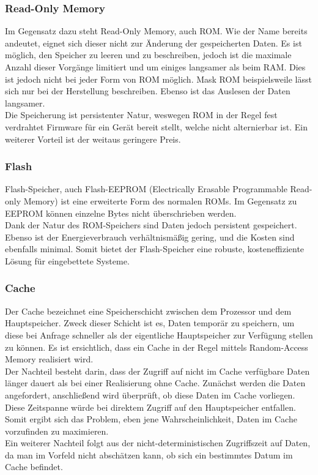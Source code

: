 \subsubsection{Read-Only Memory}
Im Gegensatz dazu steht Read-Only Memory, auch ROM. Wie der Name bereits andeutet, eignet sich dieser nicht zur Änderung der gespeicherten Daten. Es ist möglich, den Speicher zu leeren und zu beschreiben, jedoch ist die maximale Anzahl dieser Vorgänge limitiert und um einiges langsamer als beim RAM. Dies ist jedoch nicht bei jeder Form von ROM möglich. Mask ROM beispielsweile lässt sich nur bei der Herstellung beschreiben. Ebenso ist das Auslesen der Daten langsamer.\\
Die Speicherung ist persistenter Natur, weswegen ROM in der Regel fest verdrahtet Firmware für ein Gerät bereit stellt, welche nicht alternierbar ist. Ein weiterer Vorteil ist der weitaus geringere Preis.

\subsubsection{Flash}
Flash-Speicher, auch Flash-EEPROM (Electrically Erasable Programmable Read-only Memory) ist eine erweiterte Form des normalen ROMs. Im Gegensatz zu EEPROM können einzelne Bytes nicht überschrieben werden.\\
Dank der Natur des ROM-Speichers sind Daten jedoch persistent gespeichert. Ebenso ist der Energieverbrauch verhältnismäßig gering, und die Kosten sind ebenfalls minimal. Somit bietet der Flash-Speicher eine robuste, kosteneffiziente Lösung für eingebettete Systeme.

\subsubsection{Cache}
Der Cache bezeichnet eine Speicherschicht zwischen dem Prozessor und dem Hauptspeicher. Zweck dieser Schicht ist es, Daten temporär zu speichern, um diese bei Anfrage schneller als der eigentliche Hauptspeicher zur Verfügung stellen zu können. Es ist ersichtlich, dass ein Cache in der Regel mittels Random-Access Memory realisiert wird.\\
Der Nachteil besteht darin, dass der Zugriff auf nicht im Cache verfügbare Daten länger dauert als bei einer Realisierung ohne Cache. Zunächst werden die Daten angefordert, anschließend wird überprüft, ob diese Daten im Cache vorliegen. Diese Zeitspanne würde bei direktem Zugriff auf den Hauptspeicher entfallen. Somit ergibt sich das Problem, eben jene Wahrscheinlichkeit, Daten im Cache vorzufinden zu maximieren.\\
Ein weiterer Nachteil folgt aus der nicht-deterministischen Zugriffszeit auf Daten, da man im Vorfeld nicht abschätzen kann, ob sich ein bestimmtes Datum im Cache befindet.

